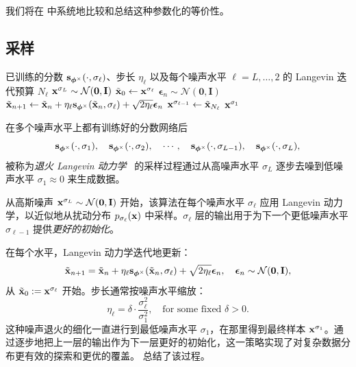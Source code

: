 我们将在  中系统地比较和总结这种参数化的等价性。



\subsection{采样} 
\begin{algorithm}[th]
\caption{\label{alg:smld} 退火 Langevin 动力学}
\begin{algorithmic}[1]
\Require 已训练的分数 ${\mathbf{s}}_{\bm{\phi}^\times}(\cdot, \sigma_\ell)$、步长 $\eta_\ell$ 以及每个噪声水平 $\ell = L, \dots, 2$ 的 Langevin 迭代预算 $N_\ell$
\State ${\mathbf{x}}^{\sigma_L} \sim \mathcal{N}(\mathbf{0}, \mathbf{I})$
    \State $\tilde{{\mathbf{x}}}_0 \gets {\mathbf{x}}^{\sigma_\ell}$
    \Statex{}
        \State $\bm{\epsilon}_n \sim \mathcal{N}(\mathbf{0}, \mathbf{I})$
        \State $\tilde{{\mathbf{x}}}_{n+1} \gets \tilde{{\mathbf{x}}}_n + \eta_\ell {\mathbf{s}}_{\bm{\phi}^\times}(\tilde{{\mathbf{x}}}_n, \sigma_\ell) + \sqrt{2\eta_\ell} \bm{\epsilon}_n$
    \EndFor
    \State ${\mathbf{x}}^{\sigma_{\ell-1}} \gets \tilde{{\mathbf{x}}}_{N_\ell}$
    \Statex {}
\EndFor
\Ensure ${\mathbf{x}}^{\sigma_1}$ 
\end{algorithmic}
\end{algorithm}


在多个噪声水平上都有训练好的分数网络后
\[
{\mathbf{s}}_{\bm{\phi}^\times}(\cdot, \sigma_1), \quad{\mathbf{s}}_{\bm{\phi}^\times}(\cdot, \sigma_2), \quad \cdots, \quad {\mathbf{s}}_{\bm{\phi}^\times}(\cdot, \sigma_{L-1}), \quad    {\mathbf{s}}_{\bm{\phi}^\times}(\cdot, \sigma_L),
\]
被称为\emph{退火 Langevin 动力学}~\citep{song2019generative} 的采样过程通过从高噪声水平 $\sigma_L$ 逐步去噪到低噪声水平 $\sigma_1 \approx 0$ 来生成数据。

从高斯噪声 ${\mathbf{x}}^{\sigma_L} \sim \mathcal{N}(\bm{0}, {\mathbf{I}})$ 开始，该算法在每个噪声水平 $\sigma_\ell$ 应用 Langevin 动力学，以近似地从扰动分布 $p_{\sigma_\ell}({\mathbf{x}})$ 中采样。$\sigma_\ell$ 层的输出用于为下一个更低噪声水平 $\sigma_{\ell-1}$ 提供\emph{更好的初始化}。

在每个水平，Langevin 动力学迭代地更新：
\[
\tilde{{\mathbf{x}}}_{n+1} = \tilde{{\mathbf{x}}}_n + \eta_\ell {\mathbf{s}}_{\bm{\phi}^\times}(\tilde{{\mathbf{x}}}_n, \sigma_\ell) + \sqrt{2\eta_\ell} \bm{\epsilon}_n, \quad \bm{\epsilon}_n \sim \mathcal{N}(\bm{0}, {\mathbf{I}}),
\]
从 $\tilde{{\mathbf{x}}}_0 := {\mathbf{x}}^{\sigma_\ell}$ 开始。步长通常按噪声水平缩放：
\[
\eta_\ell = \delta \cdot \frac{\sigma_\ell^2}{\sigma_1^2}, \quad \text{for some fixed } \delta > 0.
\]
这种噪声退火的细化一直进行到最低噪声水平 $\sigma_1$，在那里得到最终样本 ${\mathbf{x}}^{\sigma_1}$。通过逐步地把上一层的输出作为下一层更好的初始化，这一策略实现了对复杂数据分布更有效的探索和更优的覆盖。 总结了该过程。

